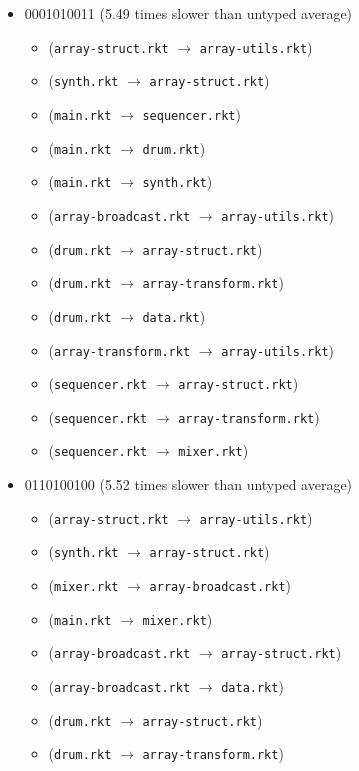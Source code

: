 \documentclass{article}
\newcommand{\mono}[1]{\texttt{#1}}
\begin{document}
\begin{itemize}
\begin{itemize}
  \end{itemize}
\item 0001010011 (5.49 times slower than untyped average)
  \begin{itemize}
  \item (\mono{array-struct.rkt} $\rightarrow$ \mono{array-utils.rkt})
  \item (\mono{synth.rkt} $\rightarrow$ \mono{array-struct.rkt})
  \item (\mono{main.rkt} $\rightarrow$ \mono{sequencer.rkt})
  \item (\mono{main.rkt} $\rightarrow$ \mono{drum.rkt})
  \item (\mono{main.rkt} $\rightarrow$ \mono{synth.rkt})
  \item (\mono{array-broadcast.rkt} $\rightarrow$ \mono{array-utils.rkt})
  \item (\mono{drum.rkt} $\rightarrow$ \mono{array-struct.rkt})
  \item (\mono{drum.rkt} $\rightarrow$ \mono{array-transform.rkt})
  \item (\mono{drum.rkt} $\rightarrow$ \mono{data.rkt})
  \item (\mono{array-transform.rkt} $\rightarrow$ \mono{array-utils.rkt})
  \item (\mono{sequencer.rkt} $\rightarrow$ \mono{array-struct.rkt})
  \item (\mono{sequencer.rkt} $\rightarrow$ \mono{array-transform.rkt})
  \item (\mono{sequencer.rkt} $\rightarrow$ \mono{mixer.rkt})
  \end{itemize}
\item 0110100100 (5.52 times slower than untyped average)
  \begin{itemize}
  \item (\mono{array-struct.rkt} $\rightarrow$ \mono{array-utils.rkt})
  \item (\mono{synth.rkt} $\rightarrow$ \mono{array-struct.rkt})
  \item (\mono{mixer.rkt} $\rightarrow$ \mono{array-broadcast.rkt})
  \item (\mono{main.rkt} $\rightarrow$ \mono{mixer.rkt})
  \item (\mono{array-broadcast.rkt} $\rightarrow$ \mono{array-struct.rkt})
  \item (\mono{array-broadcast.rkt} $\rightarrow$ \mono{data.rkt})
  \item (\mono{drum.rkt} $\rightarrow$ \mono{array-struct.rkt})
  \item (\mono{drum.rkt} $\rightarrow$ \mono{array-transform.rkt})

\end{itemize}
\end{itemize}
\end{document}
